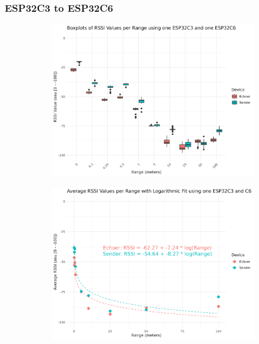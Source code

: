 \subsubsection{ESP32C3 to ESP32C6}

\begin{figure}[H]
    \centering
    \begin{subfigure}{0.45\textwidth}
        \includegraphics[width=\linewidth]{rstudio/analysis/plots/ESP32C36_rssi_box.png}
    \end{subfigure}
    \begin{subfigure}{0.45\textwidth}
        \includegraphics[width=\linewidth]{rstudio/analysis/plots/ESP32C36_avg_rssi.png}
    \end{subfigure}


\end{figure}
